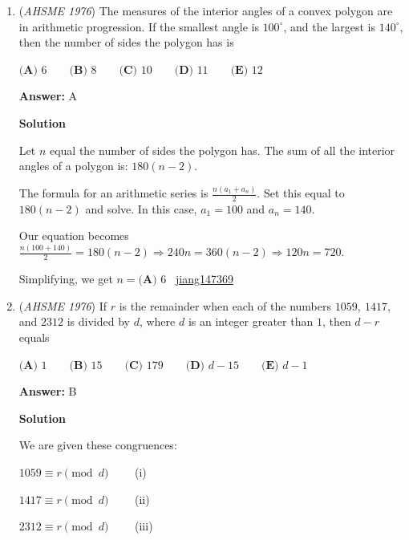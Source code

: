 \begin{enumerate}
  $x \cdot \frac{x+3}{x} \qquad (x+1) \cdot \frac{x+5}{x+1} \qquad (x+2) \cdot \frac{x}{x+3} \cdot \frac{x+5}{x+1}$ 

 Therefore, our answer is $\boxed{\textbf{(A) }\frac{x(x+2)(x+5)}{(x+1)(x+3)}}$ ~\href{https://artofproblemsolving.com/wiki/index.php/User:Jiang147369}{jiang147369}

 


	\item (\textit{AHSME 1976}) The measures of the interior angles of a convex polygon are in arithmetic progression. 
If the smallest angle is $100^\circ$, and the largest is $140^\circ$, then the number of sides the polygon has is 


 $\textbf{(A) }6\qquad \textbf{(B) }8\qquad \textbf{(C) }10\qquad \textbf{(D) }11\qquad  \textbf{(E) }12$

 \textbf{Answer: }A



\textbf{Solution}

Let $n$ equal the number of sides the polygon has. The sum of all the interior angles of a polygon is: $180(n-2)$.

 The formula for an arithmetic series is $\frac{n(a_1 + a_n)}{2}$. Set this equal to $180(n-2)$ and solve. In this case, $a_1=100$ and $a_n=140$.

 Our equation becomes $\frac{n(100+140)}{2} = 180(n-2) \Rightarrow 240n = 360(n-2) \Rightarrow 120n = 720$.

 Simplifying, we get $n = \boxed{\textbf{(A) }6}$ ~\href{https://artofproblemsolving.com/wiki/index.php/User:Jiang147369}{jiang147369}

 


	\item (\textit{AHSME 1976}) If $r$ is the remainder when each of the numbers $1059,~1417$, and $2312$ is divided by $d$, where $d$ is an integer greater than $1$, then $d-r$ equals 


 $\textbf{(A) }1\qquad \textbf{(B) }15\qquad \textbf{(C) }179\qquad \textbf{(D) }d-15\qquad  \textbf{(E) }d-1$

 \textbf{Answer: }B



\textbf{Solution}

We are given these congruences:

 $1059 \equiv r \pmod{d} \qquad$ (i)

 $1417 \equiv r \pmod{d} \qquad$ (ii)

 $2312 \equiv r \pmod{d} \qquad$ (iii)


\end{enumerate}
